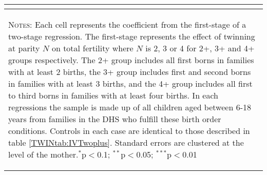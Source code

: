 \begin{landscape}
\begin{table}[htpb!]
\begin{center}
\begin{tabular}{lccccccccc}
\begin{footnotesize}\end{footnotesize}&\begin{footnotesize}\end{footnotesize}&\begin{footnotesize}\end{footnotesize}&\begin{footnotesize}\end{footnotesize}&\begin{footnotesize}\end{footnotesize}&\begin{footnotesize}\end{footnotesize}&\begin{footnotesize}\end{footnotesize}&\begin{footnotesize}\end{footnotesize}&\begin{footnotesize}\end{footnotesize}&\begin{footnotesize}\end{footnotesize}\\
\midrule\multicolumn{10}{p{18.0cm}}{\begin{footnotesize}\textsc{Notes:} Each cell represents the coefficient from the first-stage of a two-stage regression.  The first-stage represents the effect of twinning at parity $N$ on total fertility where $N$ is 2, 3 or 4 for 2+, 3+ and 4+ groups respectively.  The 2+ group includes all first borns in families with at least 2 births, the 3+ group includes first and second borns in families with at least 3 births, and the 4+ group includes all first to third borns in families with at least four births.  In each regressions the sample is made up of all children aged between 6-18 years from families in the DHS who fulfill these birth order conditions.  Controls in each case are identical to those described in table \ref{TWINtab:IVTwoplus}.  Standard errors are clustered at the level of the mother.$^{*}$p$<$0.1; $^{**}$p$<$0.05; $^{***}$p$<$0.01 
\end{footnotesize}} \\ \bottomrule 
\end{tabular}\end{center}\end{table}\end{landscape}